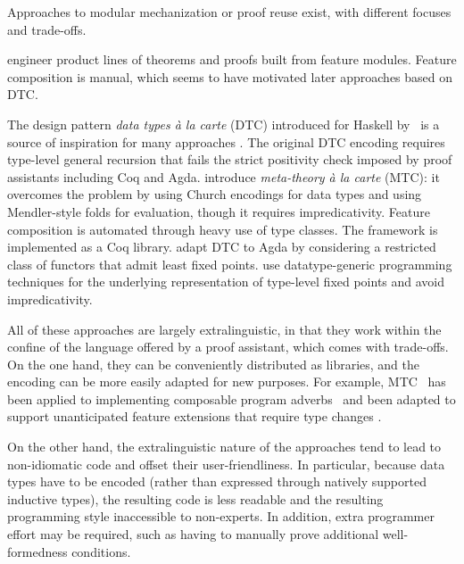 Approaches to modular mechanization or proof reuse exist,
with different focuses and trade-offs.


\citet{delaware2011} engineer product lines of theorems and proofs built
from feature modules. Feature composition is manual, which seems to have
motivated later approaches based on DTC.

The design pattern \emph{data types à la carte} (DTC) introduced for Haskell by~\citet{dtc}
is a source of inspiration for many approaches
\cite{delaware2013,delaware2013b,schwaab2013modular,keuchel2013generic,forsta2020}.
The original DTC encoding requires type-level general recursion that
fails the strict positivity check imposed by proof assistants including Coq and Agda.
\citet{delaware2013} introduce \emph{meta-theory à la carte} (MTC):
it overcomes the problem by using Church encodings for
data types and using Mendler-style folds for evaluation,
though it requires  impredicativity.
Feature composition is automated through heavy use of type classes.
The framework is implemented as a Coq library.
\citet{schwaab2013modular} adapt DTC to Agda by considering a restricted
class of functors that admit least fixed points.
\citet{keuchel2013generic} use datatype-generic programming techniques
for the underlying representation of type-level fixed points and
avoid  impredicativity.

All of these approaches are largely extra\-linguistic, in that they work
within the confine of the language offered by a proof assistant, which
comes with trade-offs.
On the one hand,
they can be conveniently distributed as libraries, and the encoding can
be more easily adapted for new purposes.
For example, MTC~\cite{delaware2013} has been applied to implementing
composable program adverbs~\cite{liwei2022} and been adapted to support
unanticipated feature extensions that require type changes
\cite{delaware2013b}.

On the other hand, the extra\-linguistic nature of the approaches tend
to lead to non-idiomatic code and offset their user-friendliness.
In particular, because data types have to be encoded (rather than expressed
through natively supported inductive types), the resulting code is
less readable and the resulting programming style inaccessible to non-experts.
In addition, extra programmer effort may be required, such as
having to manually prove additional well-formedness conditions. %

